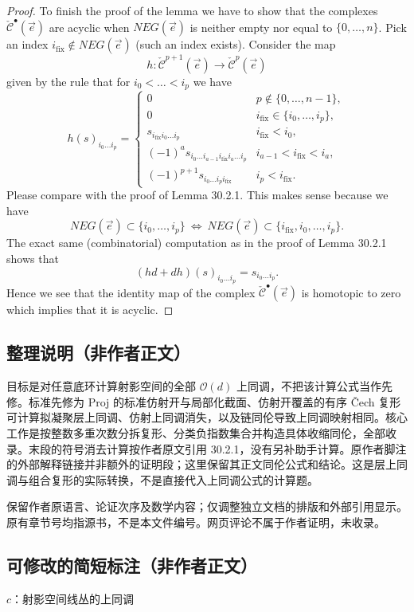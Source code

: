 \documentclass[UTF8,11pt]{ctexart}
\theoremstyle{definition}
\begin{document}
\begin{proof}
To finish the proof of the lemma we have to show that the complexes $\check{\mathcal C}^{\bullet}(\vec e)$ are acyclic when $NEG(\vec e)$ is neither empty nor equal to $\{0,\ldots,n\}$. Pick an index $i_{\mathrm{fix}}\notin NEG(\vec e)$ (such an index exists). Consider the map
\[
h:\check{\mathcal C}^{p+1}(\vec e)\to\check{\mathcal C}^{p}(\vec e)
\]
given by the rule that for $i_0<\ldots<i_p$ we have
\[
h(s)_{i_0\ldots i_p}=\begin{cases}
0&p\notin\{0,\ldots,n-1\},\\
0&i_{\mathrm{fix}}\in\{i_0,\ldots,i_p\},\\
s_{i_{\mathrm{fix}}i_0\ldots i_p}&i_{\mathrm{fix}}<i_0,\\
(-1)^as_{i_0\ldots i_{a-1}i_{\mathrm{fix}}i_a\ldots i_p}&i_{a-1}<i_{\mathrm{fix}}<i_a,\\
(-1)^{p+1}s_{i_0\ldots i_pi_{\mathrm{fix}}}&i_p<i_{\mathrm{fix}}.
\end{cases}
\]
Please compare with the proof of Lemma 30.2.1. This makes sense because we have
\[
NEG(\vec e)\subset\{i_0,\ldots,i_p\}\ \Longleftrightarrow\
NEG(\vec e)\subset\{i_{\mathrm{fix}},i_0,\ldots,i_p\}.
\]
The exact same (combinatorial) computation as in the proof of Lemma 30.2.1 shows that
\[
(hd+dh)(s)_{i_0\ldots i_p}=s_{i_0\ldots i_p}.
\]
Hence we see that the identity map of the complex $\check{\mathcal C}^{\bullet}(\vec e)$ is homotopic to zero which implies that it is acyclic.
\end{proof}

\subsection*{整理说明（非作者正文）}
目标是对任意底环计算射影空间的全部 $\mathcal O(d)$ 上同调，不把该计算公式当作先修。标准先修为 Proj 的标准仿射开与局部化截面、仿射开覆盖的有序 \v Cech 复形可计算拟凝聚层上同调、仿射上同调消失，以及链同伦导致上同调映射相同。核心工作是按整数多重次数分拆复形、分类负指数集合并构造具体收缩同伦，全部收录。末段的符号消去计算按作者原文引用 30.2.1，没有另补助手计算。原作者脚注的外部解释链接并非额外的证明段；这里保留其正文同伦公式和结论。这是层上同调与组合复形的实际转换，不是直接代入上同调公式的计算题。

保留作者原语言、论证次序及数学内容；仅调整独立文档的排版和外部引用显示。原有章节号均指源书，不是本文件编号。网页评论不属于作者证明，未收录。
\subsection*{可修改的简短标注（非作者正文）}
$c$：射影空间线丛的上同调
\end{document}
